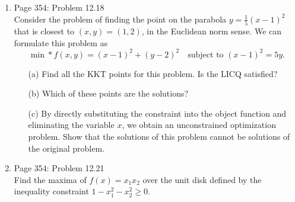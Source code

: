 \documentclass[11pt, oneside]{article}
\begin{document}
\begin{enumerate}
    \begin{proof}
      
    \end{proof}

  \item %
    Page 354: Problem 12.18 \\
    Consider the problem of finding the point on the parabola
    $y = \frac{1}{5}(x - 1)^2$ that is closest to $(x, y) = (1, 2)$, in the
    Euclidean norm sense.
    We can formulate this problem as
    \[
      \min*{f(x, y)} = (x - 1)^2 + (y - 2)^2 \quad \text{subject to } (x - 1)^2 = 5y.
    \]
    \begin{enumerate}
      \item[(a)]
        Find all the KKT points for this problem.
        Is the LICQ satisfied?

      \item[(b)]
        Which of these points are the solutions?

      \item[(c)]
        By directly substituting the constraint into the object function and
        eliminating the variable $x$, we obtain an unconstrained optimization
        problem.
        Show that the solutions of this problem cannot be solutions of the
        original problem.
    \end{enumerate}

  \item %
    Page 354: Problem 12.21 \\
    Find the maxima of $f(x) = x_1 x_2$ over the unit disk defined by the
    inequality constraint $1 - x_1^2 - x_2^2 \ge 0$.

\end{enumerate}
\end{document}
